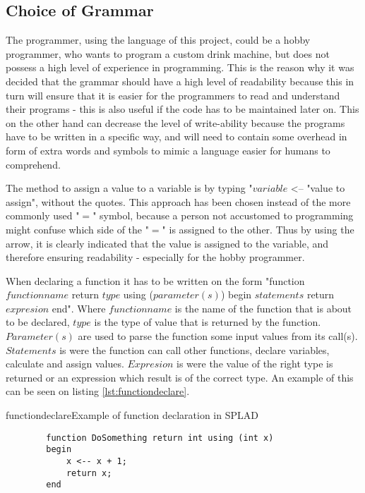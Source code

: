 \subsection{Choice of Grammar}
\label{sec:grammarchoice}
The programmer, using the language of this project, could be a hobby programmer, who wants to program a custom drink machine, but does not possess a high level of experience in programming. This is the reason why it was decided that the grammar should have a high level of readability because this in turn will ensure that it is easier for the programmers to read and understand their programs - this is also useful if the code has to be maintained later on. This on the other hand can decrease the level of write-ability because the programs have to be written in a specific way, and will need to contain some overhead in form of extra words and symbols to mimic a language easier for humans to comprehend.

The method to assign a value to a variable is by typing "$variable$ <-- "value to assign", without the quotes. This approach has been chosen instead of the more commonly used "$=$" symbol, because a person not accustomed to programming might confuse which side of the "$=$" is assigned to the other. Thus by using the arrow, it is clearly indicated that the value is assigned to the variable, and therefore ensuring readability - especially for the hobby programmer.

When declaring a function it has to be written on the form "function $functionname$ return $type$ using ($parameter(s)$) begin $statements$ return $expresion$ end". Where $functionname$ is the name of the function that is about to be declared, $type$ is the type of value that is returned by the function. $Parameter(s)$ are used to parse the function some input values from its call(s). $Statements$ is were the function can call other functions, declare variables, calculate and assign values. $Expresion$ is were the value of the right type is returned or an expression which result is of the correct type.
An example of this can be seen on listing \ref{lst:functiondeclare}.

\begin{code}{functiondeclare}{Example of function declaration in SPLAD}
	\begin{lstlisting}
		function DoSomething return int using (int x)
		begin
			x <-- x + 1;
			return x;
		end
	\end{lstlisting}
\end{code}

